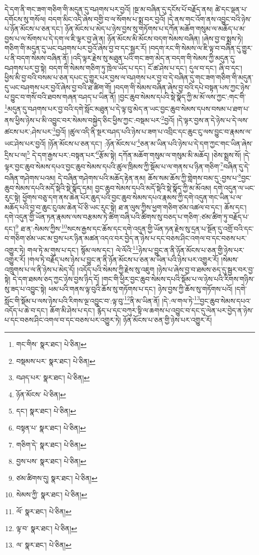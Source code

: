 དེ་དག་ནི་གང་ཟག་གཅིག་གི་མདུན་དུ་བཤགས་པར་བྱའོ། །སྔ་མ་བཞིན་དུ་དངོས་པོ་བརྗོད་ནས། ཚེ་དང་ལྡན་པ་དགོངས་སུ་གསོལ། བདག་མིང་འདི་ཞེས་བགྱི་བ་ལ་སོགས་པ་སྨྲ་བར་བྱའོ། །དེ་ནས་གང་འོག་ནས་འབྱུང་བའི་ཉེས་པ་ཉོན་མོངས་པ་ཅན་དང་། ཉོན་མོངས་པ་མེད་པ་ཉེས་བྱས་སུ་གཏོགས་པ་དཀོན་མཆོག་གསུམ་ལ་མཆོད་པ་མ་བྱས་པ་ལ་སོགས་པ་དེ་དག་ལ་ཇི་ལྟར་བྱ་ཞེ་ན། ཉོན་མོངས་མི་མོངས་བདག་སེམས་བཞིན། །ཞེས་བྱ་བ་སྨྲས་ཏེ། གཅིག་གི་མདུན་དུ་ཡང་བཤགས་པར་བྱའོ་ཞེས་བྱ་བ་དང་སྦྱར་རོ། །བདག་རང་གི་སེམས་ལ་ཇི་ལྟ་བ་བཞིན་དུ་གྱུར་པ་ནི་བདག་སེམས་བཞིན་ནོ། །འདི་ལྟར་རྗེས་སུ་མཐུན་པའི་གང་ཟག་མེད་ན་བདག་གི་སེམས་ཀྱི་མདུན་དུ་བཤགས་པར་བྱ་སྟེ། བདག་གི་སེམས་གཅིག་ཏུ་ཁྲེལ་ཡོད་པ་དང་། ངོ་ཚ་ཤེས་པ་དང་། དུལ་བ་དང་། ཞི་བ་དང་། ཕྱིས་མི་བྱ་བའི་བསམ་པ་ཅན་དཔང་དུ་གྱུར་པར་བྱས་ལ་བཤགས་པར་བྱ་བ་དེ་བཞིན་དུ་གང་ཟག་གཅིག་གི་མདུན་དུ་ཡང་བཤགས་པར་བྱའོ་ཞེས་བྱ་བའི་ཐ་ཚིག་གོ། །བདག་གི་སེམས་བཞིན་ཞེས་བྱ་བའི་དཔེ་བསྟན་པས་ཀྱང་ཉེས་པ་བྱུང་བ་གསོ་བའི་ཐབས་གཞན་བཤད་པ་ཡིན་ནོ། །བྱང་ཆུབ་སེམས་དཔའི་སྡེ་སྣོད་ཀྱི་མ་མོ་ལས་ཀྱང་:གང་གི་\footnote{གང་གིས་  སྣར་ཐང་།  པེ་ཅིན། }མདུན་དུ་བཤགས་པར་བྱ་བའི་དགེ་སློང་མཐུན་པ་དེ་ལྟ་བུ་མེད་ན་ཡང་བྱང་ཆུབ་སེམས་དཔས་བསམ་པ་ཐག་པ་ནས་ཕྱིས་ཉེས་པ་མི་འབྱུང་བར་སེམས་བསྐྱེད་ཅིང་ཕྱིས་ཀྱང་:བསྡམ་པར་\footnote{བསྡམས་པར་  སྣར་ཐང་།  པེ་ཅིན། }བྱའོ། །དེ་ལྟར་བྱས་ན་དེ་ཉེས་པ་དེ་ལས་ཚངས་པར་:ཤེས་པར་\footnote{བཤད་པར་  སྣར་ཐང་།  པེ་ཅིན། }བྱའོ། །ཚུལ་འདི་ནི་སྔར་བཤད་པའི་ཉེས་པ་ཟག་པ་འབྲིང་དང་ཆུང་ངུ་ལས་བྱུང་བ་རྣམས་ལ་ཡང་ཤེས་པར་བྱའོ། །ཉོན་མོངས་པ་ཅན་དང་། :ཉོན་མོངས་པ་\footnote{ཉོན་མོངས་  པེ་ཅིན། }ཅན་མ་ཡིན་པའི་ཉེས་པ་དེ་དག་ཀྱང་གང་ཡིན་ཞེས་དྲིས་པ་ལ།\footnote{དང་།  སྣར་ཐང་།  པེ་ཅིན། } དེ་དག་རྒྱས་པར་:བསྟན་པར་\footnote{བསྟན་པ་  སྣར་ཐང་།  པེ་ཅིན། }རྩོམ་སྟེ། དཀོན་མཆོག་གསུམ་ལ་གསུམ་མི་མཆོད། །ཅེས་སྨྲས་སོ། །དེ་ལྟར་བྱང་ཆུབ་སེམས་དཔའ་བྱང་ཆུབ་སེམས་དཔའི་ཚུལ་ཁྲིམས་ཀྱི་སྡོམ་པ་ལ་གནས་པ་ཉིན་གཅིག་\footnote{གཅིག་དེ་  སྣར་ཐང་།  པེ་ཅིན། }བཞིན་དུ་དེ་བཞིན་གཤེགས་པའམ། དེ་བཞིན་གཤེགས་པའི་མཆོད་རྟེན་ནམ། ཆོས་སམ་ཆོས་ཀྱི་གླེགས་བམ་དུ་:བྱས་པ་\footnote{བྱས་པས་  སྣར་ཐང་།  པེ་ཅིན། }བྱང་ཆུབ་སེམས་དཔའི་མདོ་སྡེའི་སྡེ་སྣོད་དམ། བྱང་ཆུབ་སེམས་དཔའི་མདོ་སྡེའི་སྡེ་སྣོད་ཀྱི་མ་མོའམ། དགེ་འདུན་ལ་ཡང་རུང་སྟེ། ཕྱོགས་བཅུ་དག་ནས་ཆེན་པོར་ཆུད་པའི་བྱང་ཆུབ་སེམས་དཔའ་རྣམས་ཀྱི་དགེ་འདུན་གང་ཡིན་པ་ལ་མཆོད་པའི་བྱ་བ་ཆུང་ངུའམ་ཆེན་པོ་ཅི་ཡང་རུང་སྟེ། ཐ་ན་ལུས་ཀྱིས་ཕྱག་གཅིག་ཙམ་འཚལ་བ་དང་། ཆོས་དང་། དགེ་འདུན་གྱི་ཡོན་ཏན་རྣམས་ལས་བརྩམས་ཏེ་ཚིག་བཞི་པའི་ཚིགས་སུ་བཅད་པ་གཅིག་:ཙམ་ཚིག་ཏུ་བརྗོད་པ་དང་།\footnote{ཙམ་ཚིགས་དུ།  སྣར་ཐང་།  པེ་ཅིན། } ཐ་ན་:སེམས་ཀྱིས་\footnote{སེམས་ཀྱི་  སྣར་ཐང་།  པེ་ཅིན། }སངས་རྒྱས་དང་ཆོས་དང་དགེ་འདུན་གྱི་ཡོན་ཏན་རྗེས་སུ་དྲན་པ་སྔོན་དུ་འགྲོ་བའི་དང་བ་གཅིག་ཙམ་ཡང་མ་བྱས་པར་ཉིན་མཚན་འདའ་བར་བྱེད་ན་ཉེས་པ་དང་བཅས་ཤིང་འགལ་བ་དང་བཅས་པར་འགྱུར་ཏེ། གལ་ཏེ་མ་གུས་པ་དང་། སྙོམ་ལས་དང་། ལེ་ལོའི་\footnote{ལོ་  སྣར་ཐང་།  པེ་ཅིན། }ཉེས་པ་བྱུང་ན་ནི་ཉོན་མོངས་པ་ཅན་གྱི་ཉེས་པར་འགྱུར་རོ། །གལ་ཏེ་བརྗོད་པས་ཉེས་པ་བྱུང་ན་ནི་ཉོན་མོངས་པ་ཅན་མ་ཡིན་པའི་ཉེས་པར་འགྱུར་རོ། །སེམས་འཁྲུགས་པ་ལ་ནི་ཉེས་པ་མེད་དོ། །འདོད་པའི་སེམས་ཀྱི་རྗེས་སུ་འཇུག །ཉེས་པ་ཞེས་བྱ་བ་ཐམས་ཅད་དུ་སྦྱར་བར་བྱ་སྟེ། དེ་དག་ཐམས་ཅད་ཀྱང་ཉེས་བྱས་ཉིད་དོ། །གང་གི་ཕྱིར་བྱང་ཆུབ་སེམས་དཔའི་སྡོམ་པ་ལ་ཉེས་པའི་རིགས་གཉིས་སུ་ཟད་པ་འབྱུང་སྟེ། ཕམ་པའི་གནས་ལྟ་བུའི་ཆོས་སུ་གཏོགས་པ་དང་། ཉེས་བྱས་ཀྱི་ཆོས་སུ་གཏོགས་པའོ། །དགེ་སློང་གི་སྡོམ་པ་ལས་ཉེས་པའི་རིགས་ལྔ་འབྱུང་བ་:ལྟ་བུ་\footnote{ལྟ་བ་  སྣར་ཐང་།  པེ་ཅིན། }ནི་མ་ཡིན་ནོ། །དེ་:ལ་གལ་ཏེ་\footnote{ལ་  སྣར་ཐང་།  པེ་ཅིན། }བྱང་ཆུབ་སེམས་དཔའ་འདོད་པ་ཆེ་བ་དང་། ཆོག་མི་ཤེས་པ་དང་། རྙེད་པ་དང་བཀུར་སྟི་ལ་ཆགས་པ་འབྱུང་བ་དང་དུ་ལེན་པར་བྱེད་ན་ཉེས་པ་དང་བཅས་ཤིང་འགལ་བ་དང་བཅས་པར་འགྱུར་ཏེ། ཉོན་མོངས་པ་ཅན་གྱི་ཉེས་པར་འགྱུར་རོ། 